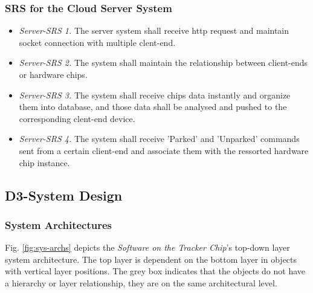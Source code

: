 \documentclass[technote, transmag, onecolumn, 9pt]{IEEEtran}
\begin{document}
\subsubsection*{\textbf{SRS for the Cloud Server System}}

\begin{itemize}
	\item \textit{Server-SRS 1.} The server system shall receive http request
	      and maintain socket connection with multiple clent-end.

	\item \textit{Server-SRS 2.} The system shall maintain the relationship between client-ends or hardware chips.

	\item \textit{Server-SRS 3.} The system shall receive chips data instantly and organize them into database,
	      and those data shall be analysed and pushed to the corresponding clent-end device.

	\item \textit{Server-SRS 4.} The system shall receive 'Parked' and 'Unparked' commands sent from a certain client-end
	      and associate them with the ressorted hardware chip instance.
\end{itemize}

\subsection*{\textbf{D3-System Design}}

\subsubsection*{\textbf{System Architectures}}

Fig. \ref{fig:sys-archs} depicts the \textit{Software on the Tracker Chip}'s top-down layer system architecture.
The top layer is dependent on the bottom layer in objects with vertical layer positions.
The grey box indicates that the objects do not have a hierarchy or layer relationship,
they are on the same architectural level.

\end{document}
